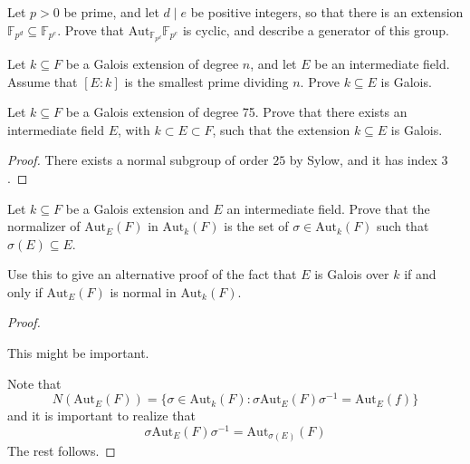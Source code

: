 \documentclass[openany]{book}
\newcommand{\aut}{\text{Aut}}
\begin{document}
\begin{prop}
Let $p > 0$ be prime, and let $d \mid e$ be positive integers, so that there is an extension $\mathbb{F}_{p^d} \subseteq \mathbb{F}_{p^e}$. Prove that $\text{Aut}_{\mathbb{F}_{p^d}} \mathbb{F}_{p^e}$ is cyclic, and describe a generator of this group.
\end{prop}

\begin{prop}
Let $k \subseteq F$ be a Galois extension of degree $n$, and let $E$ be an intermediate field. Assume that $[E : k]$ is the smallest prime dividing $n$. Prove $k \subseteq E$ is Galois.
\end{prop}

\begin{prob}
Let $k \subseteq F$ be a Galois extension of degree 75. Prove that there exists an intermediate field $E$, with $k \subset E \subset F$, such that the extension $k \subseteq E$ is Galois.
\end{prob}
\begin{proof}
    There exists a normal subgroup of order $25$ by Sylow, and it has index $3$.
\end{proof}

\begin{prob}
Let $k \subseteq F$ be a Galois extension and $E$ an intermediate field. Prove that the normalizer of $\text{Aut}_E(F)$ in $\text{Aut}_k(F)$ is the set of $\sigma \in \text{Aut}_k(F)$ such that $\sigma(E) \subseteq E$.

Use this to give an alternative proof of the fact that $E$ is Galois over $k$ if and only if $\text{Aut}_E(F)$ is normal in $\text{Aut}_k(F)$.
\end{prob}
\begin{proof}
    \begin{warn}
        This might be important.
    \end{warn}
    Note that 
    \begin{equation*}
        N(\aut_E(F))=\{\sigma\in\aut_k(F): \sigma\aut_E(F)\sigma^{-1}=\aut_E(f)\}
    \end{equation*}
    and it is important to realize that 
    \begin{equation*}
        \sigma\aut_E(F)\sigma^{-1}=\aut_{\sigma(E)}(F)
    \end{equation*}
    The rest follows.
\end{proof}
\end{document}
